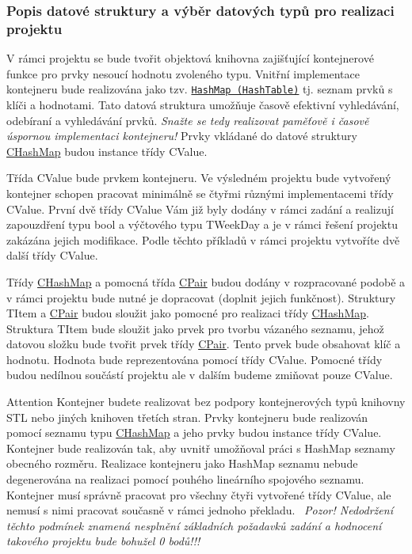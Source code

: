 \subsubsection*{Popis datové struktury a výběr datových typů pro realizaci projektu}

V rámci projektu se bude tvořit objektová knihovna zajišťující kontejnerové funkce pro prvky nesoucí hodnotu zvoleného typu. Vnitřní implementace kontejneru bude realizována jako tzv. \href{https://en.wikipedia.org/wiki/Hash_table}{\tt Hash\+Map (Hash\+Table)} tj. seznam prvků s klíči a hodnotami. Tato datová struktura umožňuje časově efektivní vyhledávání, odebíraní a vyhledávání prvků. {\itshape Snažte se tedy realizovat paměťově i časově úspornou implementaci kontejneru!} Prvky vkládané do datové struktury {\ttfamily \hyperlink{class_c_hash_map}{C\+Hash\+Map}} budou instance třídy {\ttfamily C\+Value}.

Třída {\ttfamily C\+Value} bude prvkem kontejneru. Ve výsledném projektu bude vytvořený kontejner schopen pracovat minimálně se čtyřmi různými implementacemi třídy {\ttfamily C\+Value}. První dvě třídy {\ttfamily C\+Value} Vám již byly dodány v rámci zadání a realizují zapouzdření typu {\ttfamily bool} a výčtového typu {\ttfamily T\+Week\+Day} a je v rámci řešení projektu zakázána jejich modifikace. Podle těchto příkladů v rámci projektu vytvoříte dvě další třídy {\ttfamily C\+Value}.

Třídy {\ttfamily \hyperlink{class_c_hash_map}{C\+Hash\+Map}} a pomocná třída {\ttfamily \hyperlink{class_c_pair}{C\+Pair}} budou dodány v rozpracované podobě a v rámci projektu bude nutné je dopracovat (doplnit jejich funkčnost). Struktury {\ttfamily T\+Item} a {\ttfamily \hyperlink{class_c_pair}{C\+Pair}} budou sloužit jako pomocné pro realizaci třídy {\ttfamily \hyperlink{class_c_hash_map}{C\+Hash\+Map}}. Struktura {\ttfamily T\+Item} bude sloužit jako prvek pro tvorbu vázaného seznamu, jehož datovou složku bude tvořit prvek třídy {\ttfamily \hyperlink{class_c_pair}{C\+Pair}}. Tento prvek bude obsahovat klíč a hodnotu. Hodnota bude reprezentována pomocí třídy {\ttfamily C\+Value}. Pomocné třídy budou nedílnou součástí projektu ale v dalším budeme zmiňovat pouze {\ttfamily C\+Value}.

\begin{DoxyAttention}{Attention}
Kontejner budete realizovat bez podpory kontejnerových typů knihovny S\+TL nebo jiných knihoven třetích stran. Prvky kontejneru bude realizován pomocí seznamu typu {\ttfamily \hyperlink{class_c_hash_map}{C\+Hash\+Map}} a jeho prvky budou instance třídy {\ttfamily C\+Value}. Kontejner bude realizován tak, aby uvnitř umožňoval práci s Hash\+Map seznamy obecného rozměru. Realizace kontejneru jako Hash\+Map seznamu nebude degenerována na realizaci pomocí pouhého lineárního spojového seznamu. Kontejner musí správně pracovat pro všechny čtyři vytvořené třídy {\ttfamily C\+Value}, ale nemusí s nimi pracovat současně v rámci jednoho překladu.~\newline
{\itshape Pozor! Nedodržení těchto podmínek znamená nesplnění základních požadavků zadání a hodnocení takového projektu bude bohužel 0 bodů!!!}
\end{DoxyAttention}





